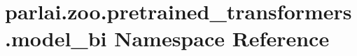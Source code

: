 \hypertarget{namespaceparlai_1_1zoo_1_1pretrained__transformers_1_1model__bi}{}\section{parlai.\+zoo.\+pretrained\+\_\+transformers.\+model\+\_\+bi Namespace Reference}
\label{namespaceparlai_1_1zoo_1_1pretrained__transformers_1_1model__bi}
